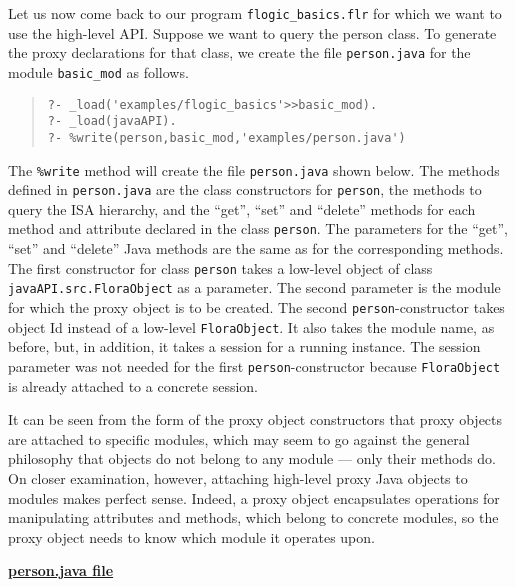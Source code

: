 Let us now come back to our program {\tt flogic\_basics.flr} for which we
want to use the high-level API.  Suppose we want to query the person class.
To generate the proxy declarations for that class, we create
the file {\tt person.java} for the 
module {\tt basic\_mod} as follows.
\begin{quote}
\begin{verbatim}
?- _load('examples/flogic_basics'>>basic_mod).
?- _load(javaAPI).
?- %write(person,basic_mod,'examples/person.java')
\end{verbatim}
\end{quote}


The {\tt \%write} method will create the file {\tt person.java} shown
below.  The methods defined in {\tt person.java} are the class constructors
for {\tt person}, the methods to query the ISA hierarchy, and the ``get'',
``set'' and ``delete'' methods for each method and attribute declared in
the \FLORA class {\tt person}.  The parameters for the ``get'', ``set'' and
``delete'' Java methods are the same as for the corresponding \FLORA
methods. The first constructor for class {\tt person} takes a low-level
object of class {\tt javaAPI.src.FloraObject} as a
parameter. The second parameter is the \FLORA module for which the proxy
object is to be created.
The second {\tt person}-constructor takes \fl object Id instead of a
low-level {\tt FloraObject}. It also takes the module name, as before, but,
in addition, it takes a session for a running \FLORA instance.
The session parameter was not needed for the first {\tt person}-constructor
because {\tt FloraObject} is already attached to a concrete session.  

It can be seen from the form of the proxy object constructors that
proxy objects are attached to specific \FLORA modules, which may seem to
go against the general philosophy that \fl objects do not belong to any
module --- only their methods do. On closer examination, however, attaching
high-level proxy Java objects to modules makes perfect sense. Indeed, a
proxy object encapsulates operations for manipulating \fl attributes 
and methods, which belong to concrete \FLORA modules, so the proxy object
needs to know which module it operates upon.


\underline{{\bf person.java file}}

